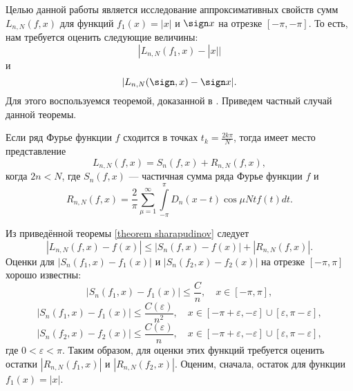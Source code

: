 Целью данной работы является исследование аппроксимативных свойств сумм $L_{n,N}(f,x)$ для функций
$f_1(x) = |x|$ и $\sign x$ на отрезке $[-\pi, -\pi]$. То есть, нам требуется оценить следующие величины:
\begin{equation*}
  |L_{n,N}(f_1,x) - |x||
\end{equation*}
и
\begin{equation*}
  |L_{n,N}(\sign,x) - \sign x|.
\end{equation*}
Для этого воспользуемся теоремой, доказанной в \cite{iishar_an1}. Приведем частный случай данной теоремы.
\begin{lemma}[Шарапудинов] \label{theorem sharapudinov}
  Если ряд Фурье функции $f$ сходится в точках $t_k = \frac{2k\pi}{N}$, тогда имеет место представление
  \begin{equation}
    L_{n,N}(f,x) = S_n(f,x) + R_{n,N}(f,x), \label{iishar_Ln_eq_Sn_Rn}
  \end{equation}
  когда $2n < N$, где $S_n(f,x)$ --- частичная сумма ряда Фурье функции $f$ и
  \begin{equation*}
    R_{n,N}(f,x) = \frac2\pi \sum\limits_{\mu=1}^{\infty} \int\limits_{-\pi}^{\pi} D_n(x-t) \cos \mu N t f(t) dt.
  \end{equation*}
\end{lemma}
Из приведённой теоремы \ref{theorem sharapudinov} следует
\begin{equation}
  |L_{n,N}(f,x) - f(x)| \leq |S_n(f,x) - f(x)| + |R_{n,N}(f,x)|. \label{Ln = Sn + Rn}
\end{equation}
Оценки для $|S_n(f_1,x) - f_1(x)|$ и $|S_n(f_2,x) - f_2(x)|$ на отрезке $[-\pi,\pi]$ хорошо известны:
\begin{equation}
  |S_n(f_1,x) - f_1(x)| \leq \frac{C}{n}, \quad x \in [-\pi, \pi], \label{Sn1 -pi pi}
\end{equation}
\begin{equation}
  |S_n(f_1,x) - f_1(x)| \leq \frac{C(\varepsilon)}{n^2}, \quad x \in [-\pi + \varepsilon,- \varepsilon] \cup [\varepsilon, \pi - \varepsilon], \label{Sn1 eps pi - eps}
\end{equation}
\begin{equation}
  |S_n(f_2,x) - f_2(x)| \leq \frac{C(\varepsilon)}{n}, \quad x \in [-\pi + \varepsilon,- \varepsilon] \cup [\varepsilon, \pi - \varepsilon], \label{Sn2 eps pi - eps}
\end{equation}
где $0 < \varepsilon < \pi$.
Таким образом, для оценки этих функций требуется оценить остатки $|R_{n,N}(f_1,x)|$ и $|R_{n,N}(f_2,x)|$.
Оценим, сначала, остаток для функции $f_1(x) = |x|$.


